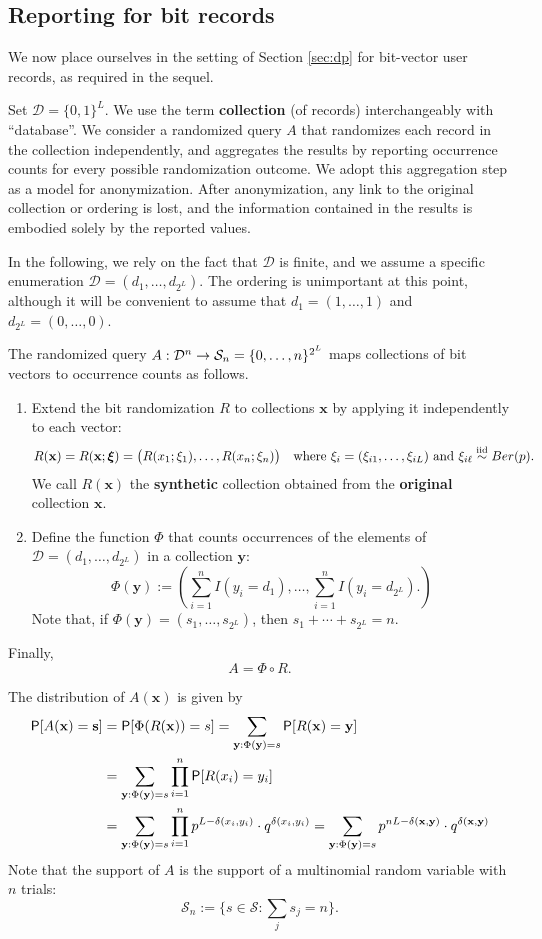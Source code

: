 \documentclass[11pt,draft]{article}
\newcommand{\Dsp}{\mathcal{D}}
\newcommand{\Ssp}{\mathcal{S}}
\newcommand{\xv}{\mathbf{x}}
\newcommand{\yv}{\mathbf{y}}
\newcommand{\sv}{\mathbf{s}}
\begin{document}
\subsection{Reporting for bit records}

We now place ourselves in the setting of Section \ref{sec:dp} for bit-vector user records, as required in the sequel.

Set $\Dsp = \{0,1\}^L$. We use the term \textbf{collection} (of records) interchangeably with ``database''.
We consider a randomized query $A$ that randomizes each record in the collection independently, and aggregates the results by reporting occurrence counts for every possible randomization outcome.
We adopt this aggregation step as a model for anonymization. After anonymization, any link to the original collection or ordering is lost, and the information contained in the results is embodied solely by the reported values.

In the following, we rely on the fact that $\Dsp$ is finite, and we assume a specific enumeration $\Dsp = (d_1,\dots,d_{2^L})$. The ordering is unimportant at this point, although it will be convenient to assume that $d_1 =  (1,\dots,1)$ and $d_{2^L} = (0,\dots,0)$.

\begin{defn}
The randomized query $\map{A}{\Dsp^n}{\Ssp_n = \{0,\dots,n\}^{2^L}}$ maps collections of bit vectors to occurrence counts as follows.
\begin{enumerate}
\renewcommand{\labelenumi}{(\alph{enumi})}
\item Extend the bit randomization $R$ to collections $\xv$ by applying it independently to each vector:
\[ R(\xv) = R(\xv;\boldsymbol{\xi})
= \big(R(x_1;\xi_1),\dots,R(x_n; \xi_n)\big)
\quad\text{where } \xi_i = (\xi_{i1},\dots,\xi_{iL}) \text{ and }
\xi_{i\ell} \iid Ber(p). \]
We call $R(\xv)$ the \textbf{synthetic} collection obtained from the \textbf{original} collection $\xv$.
\item Define the function $\Phi$ that counts occurrences of the elements of $\Dsp = (d_1,\dots,d_{2^L})$ in a collection $\yv$:
\[ \Phi(\yv) := \left(\sum_{i = 1}^n I(y_i = d_1),\dots,
\sum_{i = 1}^n I(y_i = d_{2^L}).
\right)
\]
Note that, if $\Phi(\yv) = (s_1,\dots,s_{2^L})$, then $s_1 + \cdots + s_{2^L} = n$.
\end{enumerate}
Finally,
\[ A  = \Phi \circ R. \]
\end{defn}

The distribution of $A(\xv)$ is given by
\begin{align}
\P[A(\xv) = \sv] &= \P[\Phi(R(\xv)) = s]
= \sum_{\yv:\Phi(\yv) = s} \P[R(\xv) = \yv] \nonumber\\
&= \sum_{\yv:\Phi(\yv) = s} \prod_{i=1}^n \P[R(x_i) = y_i]
\label{eq:Adist}\\
&= \sum_{\yv:\Phi(\yv) = s} \prod_{i=1}^n p^{L - \delta(x_i,y_i)}\cdot
q^{\delta(x_i,y_i)}
= \sum_{\yv:\Phi(\yv) = s} p^{nL - \delta(\xv,\yv)}\cdot
q^{\delta(\xv,\yv)}  \nonumber
\end{align}
Note that the support of $A$ is the support of a multinomial random variable with $n$ trials: \[\Ssp_n := \bigg\{s \in \Ssp : \sum_j s_j = n \bigg\}.\]
\end{document}
